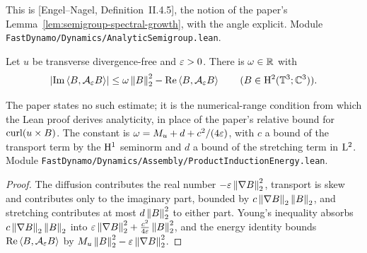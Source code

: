This is [Engel--Nagel, Definition~II.4.5], the notion of the paper's
Lemma~\ref{lem:semigroup-spectral-growth}, with the angle explicit.  Module
\texttt{FastDynamo/Dynamics/AnalyticSemigroup.lean}.

\begin{lemma}
  \label{lem:dynamics:sectorial}
  \leanok
  Let $u$ be transverse divergence-free and $\varepsilon>0$.  There is $\omega\in\mathbb{R}$ with
  \[
    \left\lvert\operatorname{Im}\left\langle B,\mathcal A_\varepsilon B\right\rangle\right\rvert\leq\omega\left\|B\right\|_2^2-\operatorname{Re}\left\langle B,\mathcal A_\varepsilon B\right\rangle
    \qquad(B\in\mathrm{H}^2(\mathbb{T}^3;\mathbb{C}^3)).
  \]
\end{lemma}

The paper states no such estimate; it is the numerical-range condition from which the Lean
proof derives analyticity, in place of the paper's relative bound for $\operatorname{curl}(u\times B)$.  The
constant is $\omega=M_u+d+c^2/(4\varepsilon)$, with $c$ a bound of the transport term by the $\mathrm{H}^1$
seminorm and $d$ a bound of the stretching term in $\mathrm{L}^2$.  Module
\texttt{FastDynamo/Dynamics/Assembly/ProductInductionEnergy.lean}.

\begin{proof}
  \leanok
  The diffusion contributes the real number $-\varepsilon\left\|\nabla B\right\|_2^2$, transport is skew and
  contributes only to the imaginary part, bounded by $c\left\|\nabla B\right\|_2\left\|B\right\|_2$, and
  stretching contributes at most $d\left\|B\right\|_2^2$ to either part.  Young's inequality absorbs
  $c\left\|\nabla B\right\|_2\left\|B\right\|_2$ into $\varepsilon\left\|\nabla B\right\|_2^2+\tfrac{c^2}{4\varepsilon}\left\|B\right\|_2^2$,
  and the energy identity bounds $\operatorname{Re}\left\langle B,\mathcal A_\varepsilon B\right\rangle$ by
  $M_u\left\|B\right\|_2^2-\varepsilon\left\|\nabla B\right\|_2^2$.
\end{proof}

